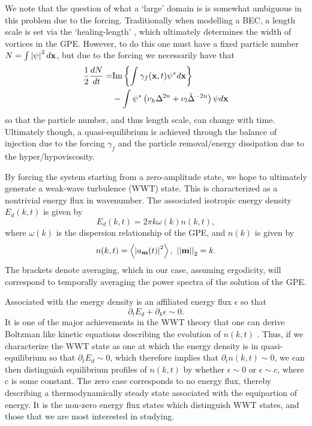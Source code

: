 \documentclass[aps,prl,preprint,groupedaddress]{revtex4-1}
\newcommand{\pd}{\partial}
\newcommand{\gnorm}[1]{\left|\left| #1\right|\right|}
\begin{document}
We note that the question of what a `large' domain is is somewhat ambiguous in this problem due to the forcing.  Traditionally when modelling a BEC, a length scale is set via the `healing-length' \cite{pethick}, which ultimately determines the width of vortices in the GPE.  However, to do this one must have a fixed particle number $N= \int \left|\psi\right|^{2}d{\bf x}$, but due to the forcing we necessarily have that 
\begin{align*}
\frac{1}{2}\frac{dN}{dt} = &  \mbox{Im}\left\{\int \gamma_{f}({\bf x},t) \psi^{\ast} d{\bf x} \right\}\\
& - \int \psi^{\ast}\left(\nu_{h}\Delta^{2n}+\nu_{l}\tilde{\Delta}^{-2n}\right)\psi d{\bf x}
\end{align*}
so that the particle number, and thus length scale, can change with time.  Ultimately though, a quasi-equilibrium is achieved through the balance of injection due to the forcing $\gamma_{f}$ and the particle removal/energy dissipation due to the hyper/hypoviscosity.  

By forcing the system starting from a zero-amplitude state, we hope to ultimately generate a weak-wave turbulence (WWT) state.  This is characterized as a nontrivial energy flux in wavenumber.  The associated isotropic energy density $E_{d}(k,t)$ is given by 
\[
E_{d}(k,t) = 2\pi k\omega(k)n(k,t), 
\]
where $\omega(k)$ is the dispersion relationship of the GPE, and $n(k)$ is given by 
\[
n(k,t) = \left< \left|a_{{\bf m}}(t)\right|^{2}\right>, ~ \gnorm{{\bf m}}_{2} = k.
\]
The brackets denote averaging, which in our case, assuming ergodicity, will correspond to temporally averaging the power spectra of the solution of the GPE.  

Associated with the energy density is an affiliated energy flux $\epsilon$ so that 
\[
\pd_{t} E_{d} + \pd_{k}\epsilon \sim 0.
\]
It is one of the major achievements in the WWT theory that one can derive Boltzman like kinetic equations describing the evolution of $n(k,t)$ \cite{nazarenko}.  Thus, if we characterize the WWT state as one at which the energy density is in quasi-equilibrium so that $\pd_{t}E_{d}\sim 0$, which therefore implies that $\pd_{t}n(k,t)\sim 0$, we can then distinguish equilibrium profiles of $n(k,t)$ by whether $\epsilon \sim 0$ or $\epsilon \sim c$, where c is some constant.  The zero case corresponds to no energy flux, thereby describing a thermodynamically steady state associated with the equipartion of energy.  It is the non-zero energy flux states which distinguish WWT states, and those that we are most interested in studying.  
\end{document}
